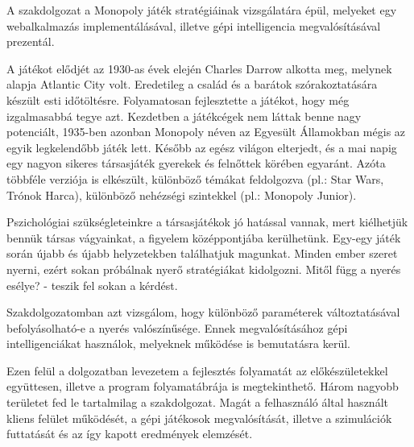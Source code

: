 
A szakdolgozat a Monopoly játék stratégiáinak vizsgálatára épül, melyeket egy webalkalmazás implementálásával, illetve gépi intelligencia megvalósításával prezentál.

	A játékot elődjét az 1930-as évek elején Charles Darrow alkotta meg, melynek alapja Atlantic City volt. Eredetileg a család és a barátok szórakoztatására készült esti időtöltésre. Folyamatosan fejlesztette a játékot, hogy még izgalmasabbá tegye azt. Kezdetben a játékcégek nem láttak benne nagy potenciált, 1935-ben azonban Monopoly néven az Egyesült Államokban mégis az egyik legkelendőbb játék lett. Később az egész világon elterjedt, és a mai napig egy nagyon sikeres társasjáték gyerekek és felnőttek körében egyaránt. Azóta többféle verziója is elkészült, különböző témákat feldolgozva (pl.: Star Wars, Trónok Harca), különböző nehézségi szintekkel (pl.: Monopoly Junior).

	Pszichológiai szükségleteinkre a társasjátékok jó hatással vannak, mert kiélhetjük bennük társas vágyainkat, a figyelem középpontjába kerülhetünk. Egy-egy játék során újabb és újabb helyzetekben találhatjuk magunkat. Minden ember szeret nyerni, ezért sokan próbálnak nyerő stratégiákat kidolgozni. Mitől függ a nyerés esélye? - teszik fel sokan a kérdést.

	Szakdolgozatomban azt vizsgálom, hogy különböző paraméterek változtatásával befolyásolható-e a nyerés valószínűsége. Ennek megvalósításához gépi intelligenciákat használok, melyeknek működése is bemutatásra kerül.

Ezen felül a dolgozatban levezetem a fejlesztés folyamatát az előkészületekkel együttesen, illetve a program folyamatábrája is megtekinthető. Három nagyobb területet fed le tartalmilag a szakdolgozat. Magát a felhasználó által használt kliens felület működését, a gépi játékosok megvalósítását, illetve a szimulációk futtatását és az így kapott eredmények elemzését.